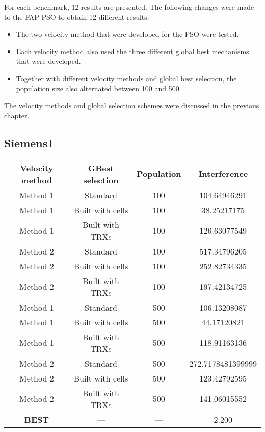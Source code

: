 For each benchmark, 12 results are presented. The following changes were made to the FAP PSO to obtain 12 different results:
\begin{itemize}
\item The two velocity method that were developed for the PSO were tested.
\item Each velocity method also used the three different global best mechanisms that were developed.
\item Together with different velocity methods and global best selection, the population size also alternated between 100 and 500.
\end{itemize}
The velocity methods and global selection schemes were discussed in the previous chapter.
\subsection{Siemens1}
\begin{center}
	\begin{tabular}{| c | c | c | c |}
	\hline
	Velocity method & GBest selection & Population & Interference\\ \hline
	Method 1 & Standard & 100 & 104.64946291\\ \hline
	Method 1 & Built with cells & 100 & 38.25217175\\ \hline
	Method 1 & Built with TRXs & 100 & 126.63077549\\ \hline
	Method 2 & Standard & 100 & 517.34796205\\ \hline
	Method 2 & Built with cells & 100 & 252.82734335\\ \hline
	Method 2 & Built with TRXs & 100 & 197.42134725\\ \hline
	Method 1 & Standard & 500 & 106.13208087\\ \hline
	Method 1 & Built with cells & 500 & 44.17120821\\ \hline
	Method 1 & Built with TRXs & 500 & 118.91163136\\ \hline
	Method 2 & Standard & 500 & 272.7178481399999\\ \hline
	Method 2 & Built with cells & 500 & 123.42792595\\ \hline
	Method 2 & Built with TRXs & 500 & 141.06015552\\ \hline
	\textbf{BEST} & --- & --- & 2.200\\ \hline
	\end{tabular}
\end{center}
